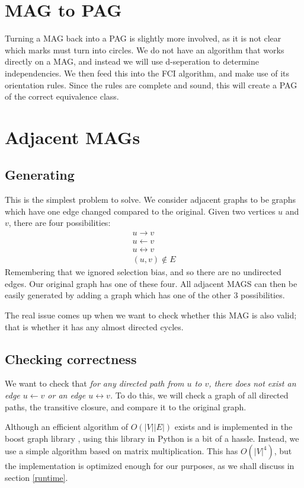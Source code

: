 \documentclass[11pt,a4paper]{report}
\theoremstyle{definition}
\begin{document}
\section{MAG to PAG}
Turning a MAG back into a PAG is slightly more involved, as it is not
clear which marks must turn into circles. We do not have an algorithm that
works directly on a MAG, and instead we will use d-seperation to determine
independencies. We then feed this into the FCI algorithm, and make use of
its orientation rules. Since the rules are complete and sound, this will
create a PAG of the correct equivalence class.

\section{Adjacent MAGs}
\subsection{Generating}
This is the simplest problem to solve. We consider adjacent graphs to be
graphs which have one edge changed compared to the original. Given two
vertices $u$ and $v$, there are four possibilities:
\begin{align}
  u \rightarrow v \\
  u \leftarrow v \\
  u \leftrightarrow v\\
  (u, v) \notin E
\end{align}
Remembering that we ignored selection bias, and so there are no undirected
edges. Our original graph has one of these four. All adjacent MAGS can
then be easily generated by adding a graph which has one of the other 3
possibilities.

The real issue comes up when we want to check whether this MAG is also
valid; that is whether it has any almost directed cycles.

\subsection{Checking correctness}\label{transitive_closure}
We want to check that \emph{for any directed path from $u$ to $v$, there
does not exist an edge $u \leftarrow v$ or an edge $u \leftrightarrow v$.
} To do this, we will check a graph of all directed paths, the transitive
closure, and compare it to the original graph.

Although an efficient algorithm of $O(|V||E|)$ exists
\cite{purdomTransitiveClosureAlgorithm1970} and is implemented in the
boost graph library \cite{siekBoostGraphLibrary2002}, using this library
in Python is a bit of a hassle. Instead, we use a simple algorithm based
on matrix multiplication. This has $O(|V|^4)$, but the implementation is
optimized enough for our purposes, as we shall discuss in section
\ref{runtime}.
\end{document}

